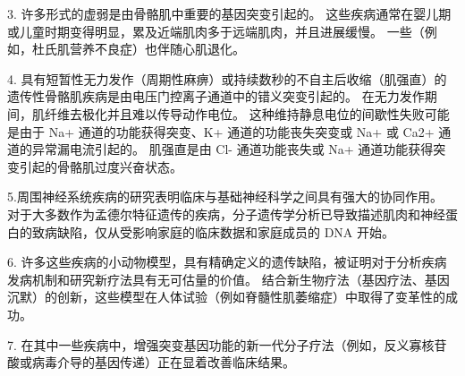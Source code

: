 3. 许多形式的虚弱是由骨骼肌中重要的基因突变引起的。 这些疾病通常在婴儿期或儿童时期变得明显，累及近端肌肉多于远端肌肉，并且进展缓慢。 一些（例如，杜氏肌营养不良症）也伴随心肌退化。 

4. 具有短暂性无力发作（周期性麻痹）或持续数秒的不自主后收缩（肌强直）的遗传性骨骼肌疾病是由电压门控离子通道中的错义突变引起的。 在无力发作期间，肌纤维去极化并且难以传导动作电位。 这种维持静息电位的间歇性失败可能是由于 Na+ 通道的功能获得突变、K+ 通道的功能丧失突变或 Na+ 或 Ca2+ 通道的异常漏电流引起的。 肌强直是由 Cl- 通道功能丧失或 Na+ 通道功能获得突变引起的骨骼肌过度兴奋状态。 

5.周围神经系统疾病的研究表明临床与基础神经科学之间具有强大的协同作用。 对于大多数作为孟德尔特征遗传的疾病，分子遗传学分析已导致描述肌肉和神经蛋白的致病缺陷，仅从受影响家庭的临床数据和家庭成员的 DNA 开始。 

6. 许多这些疾病的小动物模型，具有精确定义的遗传缺陷，被证明对于分析疾病发病机制和研究新疗法具有无可估量的价值。 结合新生物疗法（基因疗法、基因沉默）的创新，这些模型在人体试验（例如脊髓性肌萎缩症）中取得了变革性的成功。 

7. 在其中一些疾病中，增强突变基因功能的新一代分子疗法（例如，反义寡核苷酸或病毒介导的基因传递）正在显着改善临床结果。


